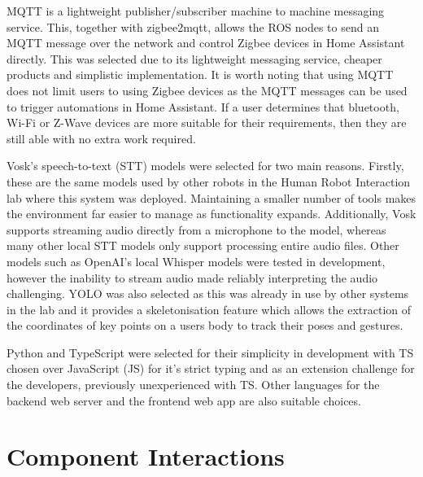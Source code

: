 MQTT is a lightweight publisher/subscriber machine to machine messaging service.
This, together with zigbee2mqtt, allows the ROS nodes to send an MQTT message over the network and control Zigbee devices in Home Assistant directly.
This was selected due to its lightweight messaging service, cheaper products and simplistic implementation.
It is worth noting that using MQTT does not limit users to using Zigbee devices as the MQTT messages can be used to trigger automations in Home Assistant.
If a user determines that bluetooth, Wi-Fi or Z-Wave devices are more suitable for their requirements, then they are still able with no extra work required.

Vosk's speech-to-text (STT) models were selected for two main reasons.
Firstly, these are the same models used by other robots in the Human Robot Interaction lab where this system was deployed.
Maintaining a smaller number of tools makes the environment far easier to manage as functionality expands.
Additionally, Vosk supports streaming audio directly from a microphone to the model, whereas many other local STT models only support processing entire audio files.
Other models such as OpenAI's local Whisper models were tested in development, however the inability to stream audio made reliably interpreting the audio challenging.
YOLO was also selected as this was already in use by other systems in the lab and it provides a skeletonisation feature which allows the extraction of the coordinates of key points on a users body to track their poses and gestures. 

Python and TypeScript were selected for their simplicity in development with TS chosen over JavaScript (JS) for it's strict typing and as an extension challenge for the developers, previously unexperienced with TS.
Other languages for the backend web server and the frontend web app are also suitable choices.

\section{Component Interactions}

